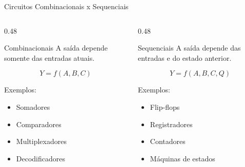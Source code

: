 
\begin{frame}{Circuitos Combinacionais x Sequenciais}

    \begin{columns}[T]

        \begin{column}{0.48\textwidth}

            \begin{block}{Combinacionais}
                A saída depende somente das entradas atuais.

                \[
                    Y=f(A,B,C)
                \]

                Exemplos:

                \begin{itemize}
                    \item Somadores
                    \item Comparadores
                    \item Multiplexadores
                    \item Decodificadores
                \end{itemize}
            \end{block}

        \end{column}

        \begin{column}{0.48\textwidth}

            \begin{block}{Sequenciais}
                A saída depende das entradas e do estado anterior.

                \[
                    Y=f(A,B,C,Q)
                \]

                Exemplos:

                \begin{itemize}
                    \item Flip-flops
                    \item Registradores
                    \item Contadores
                    \item Máquinas de estados
                \end{itemize}
            \end{block}

        \end{column}

    \end{columns}

\end{frame}